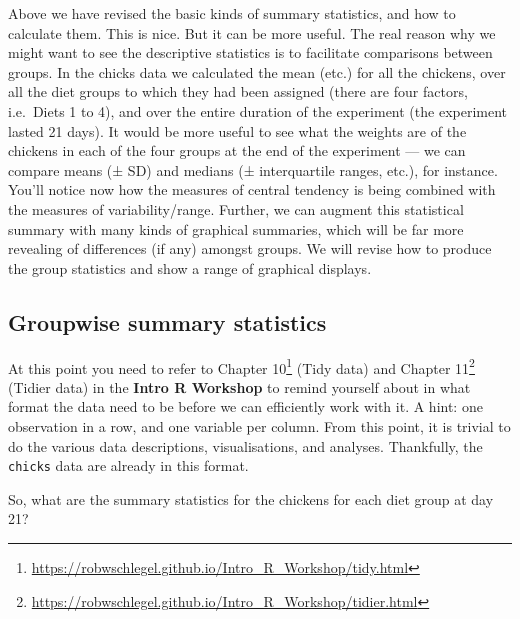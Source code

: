 \documentclass[english,10pt,a4paper,oneside]{book}
\renewcommand{\href}[2]{#2\footnote{\url{#1}}}
\let\rmarkdownfootnote\footnote%
\def\footnote{\protect\rmarkdownfootnote}
\theoremstyle{definition}
\theoremstyle{definition}
\theoremstyle{definition}
\theoremstyle{remark}
\begin{document}
Above we have revised the basic kinds of summary statistics, and how to
calculate them. This is nice. But it can be more useful. The real reason
why we might want to see the descriptive statistics is to facilitate
comparisons between groups. In the chicks data we calculated the mean
(etc.) for all the chickens, over all the diet groups to which they had
been assigned (there are four factors, i.e.~Diets 1 to 4), and over the
entire duration of the experiment (the experiment lasted 21 days). It
would be more useful to see what the weights are of the chickens in each
of the four groups at the end of the experiment --- we can compare means
(± SD) and medians (± interquartile ranges, etc.), for instance. You'll
notice now how the measures of central tendency is being combined with
the measures of variability/range. Further, we can augment this
statistical summary with many kinds of graphical summaries, which will
be far more revealing of differences (if any) amongst groups. We will
revise how to produce the group statistics and show a range of graphical
displays.

\hypertarget{groupwise-summary-statistics}{%
\subsection{Groupwise summary
statistics}\label{groupwise-summary-statistics}}

At this point you need to refer to
\href{https://robwschlegel.github.io/Intro_R_Workshop/tidy.html}{Chapter
10} (Tidy data) and
\href{https://robwschlegel.github.io/Intro_R_Workshop/tidier.html}{Chapter
11} (Tidier data) in the \textbf{Intro R Workshop} to remind yourself
about in what format the data need to be before we can efficiently work
with it. A hint: one observation in a row, and one variable per column.
From this point, it is trivial to do the various data descriptions,
visualisations, and analyses. Thankfully, the \texttt{chicks} data are
already in this format.

So, what are the summary statistics for the chickens for each diet group
at day 21?
\end{document}
